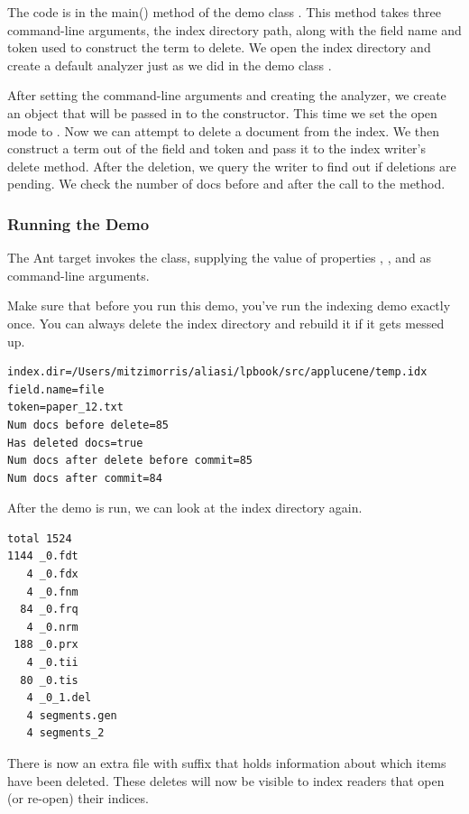 The code is in the main() method of the demo class .
This method takes three command-line arguments, the index directory path, along
with the field name and token used to construct the term to delete.
We open the index directory and create a default analyzer just as
we did in the demo class .

After setting the command-line arguments and creating the analyzer,
we create an  object that will be passed
in to the  constructor.
%
%
This time we set the open mode to
.
Now we can attempt to delete a document from the index.
%
%
We then construct a term out of the field and token and pass it to
the index writer's delete method.  After the deletion, we query the
writer to find out if deletions are pending.
We check the number of docs before and after the call to the  method.

\subsubsection{Running the Demo}

The Ant target  invokes the class, supplying
the value of properties , , and
 as command-line arguments.  

Make sure that before you run this demo, you've run the indexing
demo exactly once.  You can always delete the index directory and
rebuild it if it gets messed up.
%
\begin{verbatim}
index.dir=/Users/mitzimorris/aliasi/lpbook/src/applucene/temp.idx
field.name=file
token=paper_12.txt
Num docs before delete=85
Has deleted docs=true
Num docs after delete before commit=85
Num docs after commit=84
\end{verbatim}

After the demo is run, we can look at the index directory again.
%
\begin{verbatim}
total 1524
1144 _0.fdt
   4 _0.fdx
   4 _0.fnm
  84 _0.frq
   4 _0.nrm
 188 _0.prx
   4 _0.tii
  80 _0.tis
   4 _0_1.del
   4 segments.gen
   4 segments_2
\end{verbatim}
%
There is now an extra file with suffix  that holds
information about which items have been deleted.  These deletes will
now be visible to index readers that open (or re-open) their
indices.

